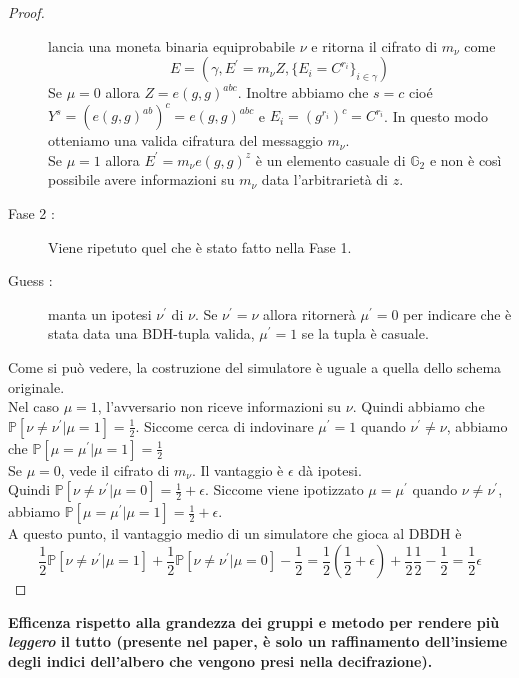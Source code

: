 \begin{thm}
\begin{proof}
\begin{description}
 lancia una moneta binaria equiprobabile $\nu$ e ritorna il cifrato di $m_\nu$ come
\[ E = (\gamma , E^\prime = m_\nu Z , \{ E_i = C^{r_i} \}_{i \in \gamma} ) \]
Se $\mu = 0$ allora $Z = e(g,g)^{abc}$. Inoltre abbiamo che $s = c$ cioé $Y^s = (e(g,g)^{ab})^c = e(g,g)^{abc}$ e $E_i = (g^{r_i})^c = C^{r_i}$. In questo modo otteniamo una valida cifratura del messaggio $m_\nu$.\\
Se $\mu = 1$ allora $E^\prime = m_\nu e(g,g)^z$ è un elemento casuale di $\mathbb{G}_2$ e non è così possibile avere informazioni su $m_\nu$ data l'arbitrarietà di $z$.
\item[Fase 2 :] Viene ripetuto quel che è stato fatto nella Fase 1.
\item[Guess :]  manta un ipotesi $\nu^\prime$ di $\nu$. Se $\nu^\prime = \nu$ allora  ritornerà $\mu^\prime = 0$ per indicare che è stata data una BDH-tupla valida, $\mu^\prime = 1$ se la tupla è casuale.
\end{description}

Come si può vedere, la costruzione del simulatore è uguale a quella dello schema originale.\\[0.5cm]
Nel caso $\mu = 1$, l'avversario non riceve informazioni su $\nu$. Quindi abbiamo che $\mathbb{P}[\nu \neq \nu^\prime | \mu = 1] = \frac{1}{2}$. Siccome  cerca di indovinare $\mu^\prime = 1$ quando $\nu^\prime \neq \nu$, abbiamo che $\mathbb{P}[\mu = \mu^\prime| \mu = 1] = \frac{1}{2}$\\
Se $\mu = 0$,  vede il cifrato di $m_\nu$. Il vantaggio è $\epsilon$ dà ipotesi.\\
Quindi $\mathbb{P}[\nu \neq \nu^\prime | \mu = 0] = \frac{1}{2} + \epsilon$. Siccome viene ipotizzato $ \mu = \mu^\prime$ quando $\nu \neq \nu^\prime$, abbiamo $\mathbb{P}[\mu = \mu^\prime | \mu = 1] = \frac{1}{2} + \epsilon$.\\
A questo punto, il vantaggio medio di un simulatore che gioca al DBDH è 
\[ \frac{1}{2} \mathbb{P}[\nu \neq \nu^\prime | \mu = 1] + \frac{1}{2}\mathbb{P}[\nu \neq \nu^\prime | \mu = 0] - \frac{1}{2}  = \frac{1}{2}\left( \frac{1}{2} + \epsilon \right) + \frac{1}{2}\frac{1}{2} - \frac{1}{2} = \frac{1}{2} \epsilon\]
\end{proof}
\end{thm}



\textbf{Efficenza rispetto alla grandezza dei gruppi e metodo per rendere più \emph{leggero} il tutto (presente nel paper, è solo un raffinamento dell'insieme degli indici dell'albero che vengono presi nella decifrazione).}







